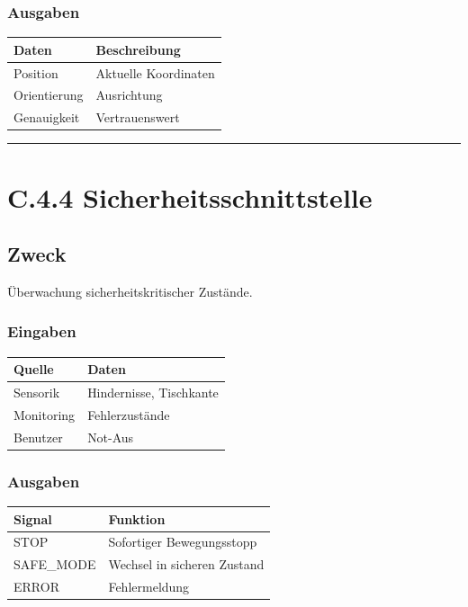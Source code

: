 \documentclass[
]{article}
\begin{document}
\subsubsection{Ausgaben}\label{ausgaben-2}

\begin{longtable}[]{@{}ll@{}}
\toprule\noalign{}
Daten & Beschreibung \\
\midrule\noalign{}
\endhead
\bottomrule\noalign{}
\endlastfoot
Position & Aktuelle Koordinaten \\
Orientierung & Ausrichtung \\
Genauigkeit & Vertrauenswert \\
\end{longtable}

\begin{center}\rule{0.5\linewidth}{0.5pt}\end{center}

\section{C.4.4
Sicherheitsschnittstelle}\label{c.4.4-sicherheitsschnittstelle}

\subsection{Zweck}\label{zweck-8}

Überwachung sicherheitskritischer Zustände.

\subsubsection{Eingaben}\label{eingaben-3}

\begin{longtable}[]{@{}ll@{}}
\toprule\noalign{}
Quelle & Daten \\
\midrule\noalign{}
\endhead
\bottomrule\noalign{}
\endlastfoot
Sensorik & Hindernisse, Tischkante \\
Monitoring & Fehlerzustände \\
Benutzer & Not-Aus \\
\end{longtable}

\subsubsection{Ausgaben}\label{ausgaben-3}

\begin{longtable}[]{@{}ll@{}}
\toprule\noalign{}
Signal & Funktion \\
\midrule\noalign{}
\endhead
\bottomrule\noalign{}
\endlastfoot
STOP & Sofortiger Bewegungsstopp \\
SAFE\_MODE & Wechsel in sicheren Zustand \\
ERROR & Fehlermeldung \\
\end{longtable}
\end{document}
